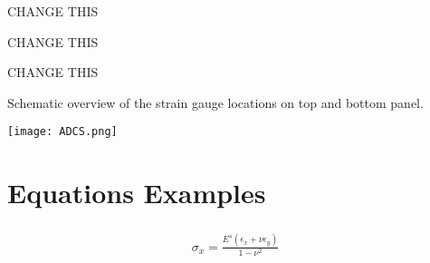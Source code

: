 \begin{makefigure}
    \caption{CHANGE THIS}
    \label{fig:CHANGETHIS}
\end{makefigure}

\begin{makefigure}

	\begin{makesubfigure}{0.5} %
		\caption{CHANGE THIS}
		\label{fig:CHANGE_THIS} %
	\end{makesubfigure}%
	\begin{makesubfigure}{0.5}
		\caption{CHANGE THIS}
		\label{fig:CHANGE_THIS}
	\end{makesubfigure}
	
    \caption{Schematic overview of the strain gauge locations on top and bottom panel.}
    \label{fig:CHANGE_THIS}
\end{makefigure}

\begin{centering}
    {\begin{minipage}{0.7\textheight} %
        \texttt{[image: ADCS.png]}%
    	\captionsetup{type=figure,width=0.55\textheight} %
    	\label{fig:CHANGE_THIS}
    \end{minipage}}
\end{centering}




\chapter{Equations Examples}


\begin{align} \label{eq:CHANGETHIS}
    \begin{split}
        \sigma_x = \frac{E^s(\epsilon_x+\nu\epsilon_y)}{1-\nu^2}
    \end{split}
\end{align}



